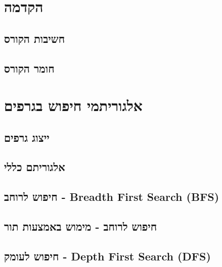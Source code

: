\documentclass[]{article}
\def\insert#1{}
\begin{document}

\section*{הקדמה}
\insert{introduction}

	\subsection*{חשיבות הקורס}
	\insert{relevant}
	
	\subsection*{חומר הקורס}
	\insert{material}
	
\section*{אלגוריתמי חיפוש בגרפים}
	\insert{search}
	
	\subsection*{ייצוג גרפים}
	\insert{graph-representation}
	
	\subsection*{אלגוריתם כללי}
	\insert{general}
	
	\subsection*{חיפוש לרוחב - \textenglish{Breadth First Search (BFS)}}
	\insert{bfs}
	
	\subsection*{חיפוש לרוחב - מימוש באמצעות תור}
	\insert{bfs-q}
	
	\subsection*{חיפוש לעומק - \textenglish{Depth First Search (DFS)}}
	\insert{dfs}
\end{document}
